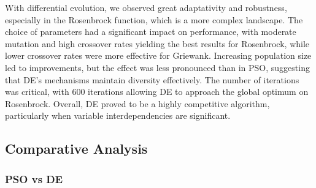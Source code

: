 \documentclass[12pt,a4paper]{article}
\begin{document}



With differential evolution, we observed great adaptativity and robustness, especially in the Rosenbrock function, which is a more complex landscape. The choice of parameters had a significant impact on performance, with moderate mutation and high crossover rates yielding the best results for Rosenbrock, while lower crossover rates were more effective for Griewank. Increasing population size led to improvements, but the effect was less pronounced than in PSO, suggesting that DE's mechanisms maintain diversity effectively. The number of iterations was critical, with 600 iterations allowing DE to approach the global optimum on Rosenbrock. Overall, DE proved to be a highly competitive algorithm, particularly when variable interdependencies are significant.
\newpage

\subsection{Comparative Analysis}
\subsubsection{PSO vs DE}
\end{document}

